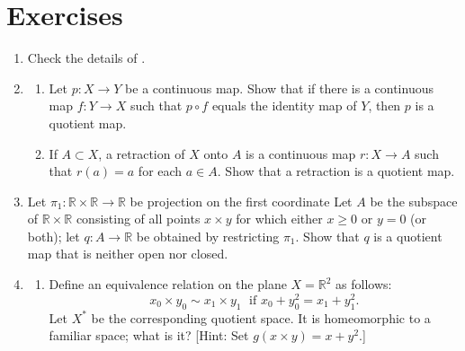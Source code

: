 \section*{Exercises}
\begin{enumerate}[itemsep=0.4em, parsep=0pt, topsep=0pt, partopsep=0pt, leftmargin=*, label=\arabic*., ref=\arabic*]
\item Check the details of .
\item
  \begin{enumerate}[itemsep=0.2em, parsep=0pt, topsep=0pt, partopsep=0pt, leftmargin=*, label=(\alph*), align=left]
  \item Let \(p : X \rightarrow Y\) be a continuous map. Show that if there is a continuous map \(f : Y \rightarrow X\) such that \(p \circ f\) equals the identity map of \(Y\), then \(p\) is a quotient map.

  \item If \(A \subset X\), a retraction of \(X\) onto \(A\) is a continuous map \(r : X \rightarrow A\) such that \(r( a) = a\) for each \(a \in A\). Show that a retraction is a quotient map.
  \end{enumerate}
\item Let \({\pi }_{1} : \mathbb{R} \times \mathbb{R} \rightarrow \mathbb{R}\) be projection on the first coordinate Let \(A\) be the subspace of \(\mathbb{R} \times \mathbb{R}\) consisting of all points \(x \times y\) for which either \(x \geq 0\) or \(y = 0\) (or both); let \(q : A \rightarrow \mathbb{R}\) be obtained by restricting \({\pi }_{1}\). Show that \(q\) is a quotient map that is neither open nor closed.
\item
  \begin{enumerate}[itemsep=0.2em, parsep=0pt, topsep=0pt, partopsep=0pt, leftmargin=*, label=(\alph*), align=left]
  \item Define an equivalence relation on the plane \(X = \mathbb{R}^{2}\) as follows: \[ x_{0} \times {y}_{0} \sim {x}_{1} \times {y}_{1}\;\text{ if }x_{0} + y_0^{2} = x_{1} + y_1^{2}. \] Let \(X^{ * }\) be the corresponding quotient space. It is homeomorphic to a familiar space; what is it? [Hint: Set \(g( {x \times y}) = x + y^{2}\).]


\end{enumerate}
\end{enumerate}
